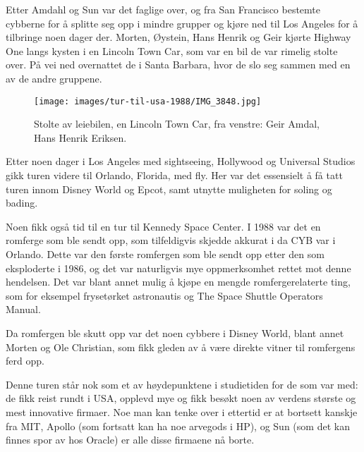 Etter Amdahl og Sun var det faglige over, og fra San Francisco bestemte cybberne for å splitte seg opp i mindre grupper og kjøre ned til Los Angeles for å tilbringe noen dager der. Morten, Øystein, Hans Henrik og Geir kjørte Highway One langs kysten i en Lincoln Town Car, som var en bil de var rimelig stolte over. På vei ned overnattet de i Santa Barbara, hvor de slo seg sammen med en av de andre gruppene.

\begin{figure}
	\texttt{[image: images/tur-til-usa-1988/IMG\_3848.jpg]}
	\caption{Stolte av leiebilen, en Lincoln Town Car, fra venstre: Geir Amdal, Hans Henrik Eriksen.}
\end{figure}

Etter noen dager i Los Angeles med sightseeing, Hollywood og Universal Studios gikk turen videre til Orlando, Florida, med fly. Her var det essensielt å få tatt turen innom Disney World og Epcot, samt utnytte muligheten for soling og bading.

Noen fikk også tid til en tur til Kennedy Space Center. I 1988 var det en romferge som ble sendt opp, som tilfeldigvis skjedde akkurat i da CYB var i Orlando. Dette var den første romfergen som ble sendt opp etter den som eksploderte i 1986, og det var naturligvis mye oppmerksomhet rettet mot denne hendelsen. Det var blant annet mulig å kjøpe en mengde romfergerelaterte ting, som for eksempel frysetørket astronautis og The Space Shuttle Operators Manual.

Da romfergen ble skutt opp var det noen cybbere i Disney World, blant annet Morten og Ole Christian, som fikk gleden av å være direkte vitner til romfergens ferd opp.

Denne turen står nok som et av høydepunktene i studietiden for de som var med: de fikk reist rundt i USA, opplevd mye og fikk besøkt noen av verdens største og mest innovative firmaer. Noe man kan tenke over i ettertid er at bortsett kanskje fra MIT, Apollo (som fortsatt kan ha noe arvegods i HP), og Sun (som det kan finnes spor av hos Oracle) er alle disse firmaene nå borte.
